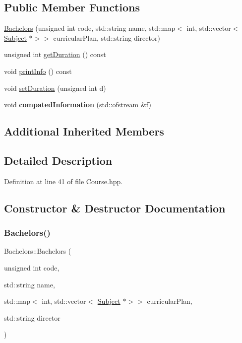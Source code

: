 \subsection*{Public Member Functions}
\begin{DoxyCompactItemize}
\item 
\hyperlink{classBachelors_abc03be4ad19aaa51d5361e0aa4544618}{Bachelors} (unsigned int code, std\+::string name, std\+::map$<$ int, std\+::vector$<$ \hyperlink{classSubject}{Subject} $\ast$$>$$>$ curricular\+Plan, std\+::string director)
\item 
unsigned int \hyperlink{classBachelors_a08ab62391dbc677cabea2489e8da1889}{get\+Duration} () const
\item 
void \hyperlink{classBachelors_a25005e4fb6cfaddb749d13be04568c8b}{print\+Info} () const
\item 
void \hyperlink{classBachelors_adc2891e100ef21476e77efe6402e7580}{set\+Duration} (unsigned int d)
\item 
\mbox{\label{classBachelors_a8cab815562dbb46b65975590792f3aae}} 
void {\bfseries compated\+Information} (std\+::ofstream \&f)
\end{DoxyCompactItemize}
\subsection*{Additional Inherited Members}


\subsection{Detailed Description}


Definition at line 41 of file Course.\+hpp.



\subsection{Constructor \& Destructor Documentation}
\mbox{\label{classBachelors_abc03be4ad19aaa51d5361e0aa4544618}} 
\subsubsection{\texorpdfstring{Bachelors()}{Bachelors()}}
{\footnotesize\ttfamily Bachelors\+::\+Bachelors (\begin{DoxyParamCaption}\item[{unsigned int}]{code,  }\item[{std\+::string}]{name,  }\item[{std\+::map$<$ int, std\+::vector$<$ \hyperlink{classSubject}{Subject} $\ast$$>$$>$}]{curricular\+Plan,  }\item[{std\+::string}]{director }\end{DoxyParamCaption})}

